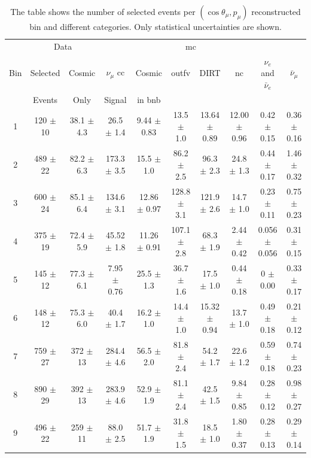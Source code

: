 \begin{table}[]
\scriptsize
\begin{adjustwidth}{-2.0cm}{-1.5cm}
\caption[Selected Events Per $(\cos\theta_\mu, p_\mu)$ Bin]{The table shows the number of selected events per $(\cos\theta_\mu, p_\mu)$ reconstructed bin and different categories. Only statistical uncertainties  are shown.}
\label{tab:pmu_costhetamu_events}
\centering
\begin{tabular}{c|cc|ccccccc}
\toprule
    & \multicolumn{2}{c}{Data}    & \multicolumn{6}{c}{\acrshort{mc}} \\
Bin & Selected & Cosmic & $\nu_\mu$ \acrshort{cc} & Cosmic  & \acrshort{outfv} & DIRT & \acrshort{nc} & $\nu_e$ and $\bar{\nu}_e$ & $\bar{\nu}_\mu$ \\
    & Events   & Only   & Signal         & in \acrshort{bnb}  &       &      &    &                           &                 \\
\midrule
1 & 120 $\pm$ 10 & 38.1 $\pm$ 4.3 & 26.5 $\pm$ 1.4 & 9.44 $\pm$ 0.83 & 13.5 $\pm$ 1.0 & 13.64 $\pm$ 0.89 & 12.00 $\pm$ 0.96 & 0.42 $\pm$ 0.15 & 0.36 $\pm$ 0.16 \\ 
2 & 489 $\pm$ 22 & 82.2 $\pm$ 6.3 & 173.3 $\pm$ 3.5 & 15.5 $\pm$ 1.0 & 86.2 $\pm$ 2.5 & 96.3 $\pm$ 2.3 & 24.8 $\pm$ 1.3 & 0.44 $\pm$ 0.17 & 1.46 $\pm$ 0.32 \\ 
3 & 600 $\pm$ 24 & 85.1 $\pm$ 6.4 & 134.6 $\pm$ 3.1 & 12.86 $\pm$ 0.97 & 128.8 $\pm$ 3.1 & 121.9 $\pm$ 2.6 & 14.7 $\pm$ 1.0 & 0.23 $\pm$ 0.11 & 0.75 $\pm$ 0.23 \\ 
4 & 375 $\pm$ 19 & 72.4 $\pm$ 5.9 & 45.52 $\pm$ 1.8 & 11.26 $\pm$ 0.91 & 107.1 $\pm$ 2.8 & 68.3 $\pm$ 1.9 & 2.44 $\pm$ 0.42 & 0.056 $\pm$ 0.056 & 0.31 $\pm$ 0.15 \\ 
5 & 145 $\pm$ 12 & 77.3 $\pm$ 6.1 & 7.95 $\pm$ 0.76 & 25.5 $\pm$ 1.3 & 36.7 $\pm$ 1.6 & 17.5 $\pm$ 1.0 & 0.44 $\pm$ 0.18 & 0 $\pm$ 0.00 & 0.33 $\pm$ 0.17 \\ 
6 & 148 $\pm$ 12 & 75.3 $\pm$ 6.0 & 40.4 $\pm$ 1.7 & 16.2 $\pm$ 1.0 & 14.4 $\pm$ 1.0 & 15.32 $\pm$ 0.94 & 13.7 $\pm$ 1.0 & 0.49 $\pm$ 0.18 & 0.21 $\pm$ 0.12 \\ 
7 & 759 $\pm$ 27 & 372 $\pm$ 13 & 284.4 $\pm$ 4.6 & 56.5 $\pm$ 2.0 & 81.8 $\pm$ 2.4 & 54.2 $\pm$ 1.7 & 22.6 $\pm$ 1.2 & 0.59 $\pm$ 0.18 & 0.74 $\pm$ 0.23 \\ 
8 & 890 $\pm$ 29 & 392 $\pm$ 13 & 283.9 $\pm$ 4.6 & 52.9 $\pm$ 1.9 & 81.1 $\pm$ 2.4 & 42.5 $\pm$ 1.5 & 9.84 $\pm$ 0.85 & 0.28 $\pm$ 0.12 & 0.98 $\pm$ 0.27 \\ 
9 & 496 $\pm$ 22 & 259 $\pm$ 11 & 88.0 $\pm$ 2.5 & 51.7 $\pm$ 1.9 & 31.8 $\pm$ 1.5 & 18.5 $\pm$ 1.0 & 1.80 $\pm$ 0.37 & 0.28 $\pm$ 0.13 & 0.29 $\pm$ 0.14 \\ 

\end{tabular}
\end{adjustwidth}
\end{table}
